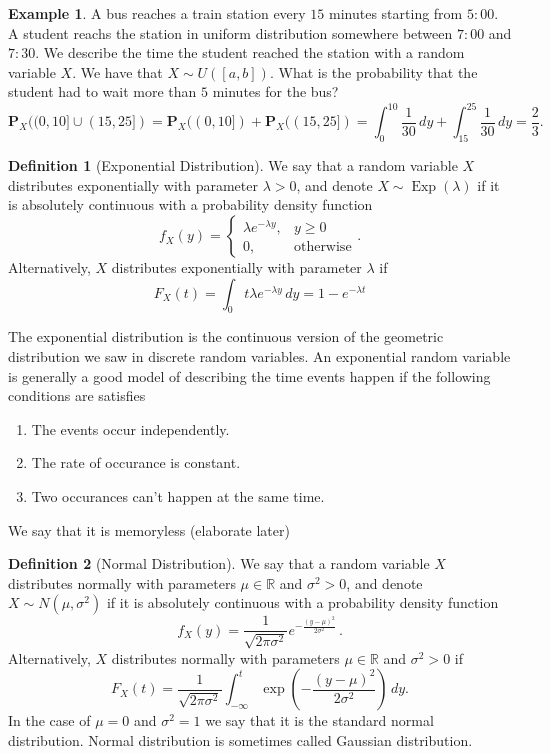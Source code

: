 \documentclass[11pt,a4paper]{article}
\theoremstyle{definition}
\newtheorem{definition}{Definition}[section]
\newtheorem{example}{Example}[section]
\theoremstyle{plain}
\DeclareMathOperator{\Exp}{Exp}
\newcommand{\R}{\mathbb{R}}
\begin{document}
  \begin{example}
    A bus reaches a train station every $15$ minutes starting from $5:00$.
    A student reachs the station in uniform distribution somewhere between
    $7:00$ and $7:30$. We describe the time the student reached the station
    with a random variable $X$. We have that $X \sim U([a,b])$. What
    is the probability that the student had to wait more than $5$ minutes
    for the bus?
    \[
      \mathbf P_X((0,10] \cup (15,25]) =
      \mathbf P_X((0,10]) + \mathbf P_X((15,25]) =
      \int_{0}^{10} \frac{1}{30}\,dy + \int_{15}^{25} \frac{1}{30}\,dy =
      \frac{2}{3}.
    \]
  \end{example}

  \begin{definition}[Exponential Distribution]
    We say that a random variable $X$ distributes exponentially with parameter
    $\lambda > 0$, and denote $X \sim \Exp(\lambda)$
    if it is absolutely continuous with a probability density function
    \[
      f_X(y) =
      \begin{cases}
        \lambda e^{-\lambda y}, &y \geq 0 \\
        0, &\text{otherwise}
      \end{cases}.
    \]
    Alternatively, $X$ distributes exponentially with parameter $\lambda$ if
    \[
      F_X(t) = \int_{0}{t} \lambda e^{-\lambda y}\,dy = 1 - e^{-\lambda t}
    \]
  \end{definition}

  The exponential distribution is the continuous version of the geometric
  distribution we saw in discrete random variables. An exponential random
  variable is generally a good model of describing the time events happen
  if the following conditions are satisfies
  \begin{enumerate}
    \item The events occur independently.
    \item The rate of occurance is constant.
    \item Two occurances can't happen at the same time.
  \end{enumerate}
  We say that it is memoryless (elaborate later) %

  \begin{definition}[Normal Distribution]
    We say that a random variable $X$ distributes normally with parameters
    $\mu \in \R$ and $\sigma^2 > 0$, and denote $X \sim N(\mu, \sigma^2)$
    if it is absolutely continuous with a probability density function
    \[
      f_X(y) = 
      \frac {1}{\sqrt {2\pi \sigma ^{2}}}
      e^{-{\frac {(y-\mu)^{2}}{2\sigma ^{2}}}}\,.
    \]
    Alternatively, $X$ distributes normally with parameters $\mu \in \R$ and 
    $\sigma^2 > 0$ if
    \[
      F_X(t) = 
      \frac{1}{\sqrt{2\pi\sigma^{2}}}
      \int_{-\infty}^{t}
      \exp\left(-\frac{(y-\mu)^{2}}{2\sigma^{2}}\right)\,dy.
    \]
    In the case of $\mu = 0$ and $\sigma^2 = 1$ we say that it is the 
    standard normal distribution.
    Normal distribution is sometimes called Gaussian distribution.
  \end{definition}
\end{document}
